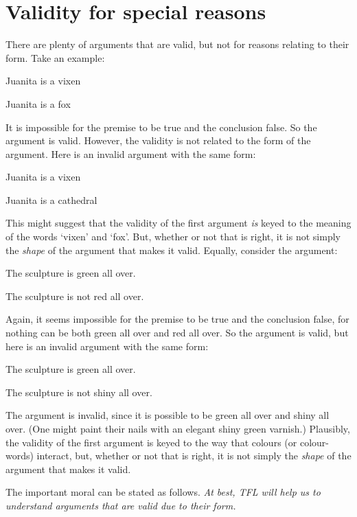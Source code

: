 \section{Validity for special reasons}
There are plenty of arguments that are valid, but not for reasons relating to their form. Take an example:
	\begin{earg}
		\item[] Juanita is a vixen
		\item[\therefore] Juanita is a fox
	\end{earg}
It is impossible for the premise to be true and the conclusion false. So the argument is valid. However, the validity is not related to the form of the argument. Here is an invalid argument with the same form:
	\begin{earg}
		\item[] Juanita is a vixen
		\item[\therefore] Juanita is a cathedral
	\end{earg}
This might suggest that the validity of the first argument \emph{is} keyed to the meaning of the words `vixen' and `fox'. But, whether or not that is right, it is not simply the \emph{shape} of the argument that makes it valid. Equally, consider the argument:
	\begin{earg}
		\item[] The sculpture is green all over.
		\item[\therefore] The sculpture is not red all over.
	\end{earg}
Again, it seems impossible for the premise to be true and the conclusion false, for nothing can be both green all over and red all over. So the argument is valid, but here is an invalid argument with the same form:
	\begin{earg}
		\item[] The sculpture is green all over.
		\item[\therefore] The sculpture is not shiny all over.
	\end{earg}
The argument is invalid, since it is possible to be green all over and shiny all over. (One might paint their nails with an elegant shiny green varnish.) Plausibly, the validity of the first argument is keyed to the way that colours (or colour-words) interact, but, whether or not that is right, it is not simply the \emph{shape} of the argument that makes it valid.

The important moral can be stated as follows. \emph{At best, TFL will help us to understand arguments that are valid due to their form.}

